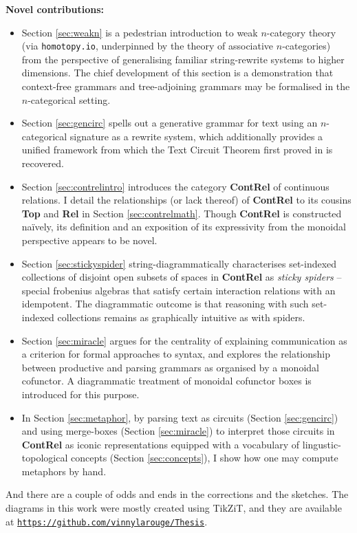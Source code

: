 \clearpage
\begin{myboxB}
\textbf{Novel contributions:}
\begin{itemize}

\item Section \ref{sec:weakn} is a pedestrian introduction to weak $n$-category theory (via \texttt{homotopy.io}, underpinned by the theory of associative $n$-categories) from the perspective of generalising familiar string-rewrite systems to higher dimensions. The chief development of this section is a demonstration that context-free grammars and tree-adjoining grammars may be formalised in the $n$-categorical setting.

\item Section \ref{sec:gencirc} spells out a generative grammar for text using an $n$-categorical signature as a rewrite system, which additionally provides a unified framework from which the Text Circuit Theorem first proved in \citep{wang-mascianicaDistillingTextCircuits2023a} is recovered.

\item Section \ref{sec:contrelintro} introduces the category \textbf{ContRel} of continuous relations. I detail the relationships (or lack thereof) of \textbf{ContRel} to its cousins \textbf{Top} and \textbf{Rel} in Section \ref{sec:contrelmath}. Though \textbf{ContRel} is constructed na\"{i}vely, its definition and an exposition of its expressivity from the monoidal perspective appears to be novel.

\item Section \ref{sec:stickyspider} string-diagrammatically characterises set-indexed collections of disjoint open subsets of spaces in \textbf{ContRel} as \emph{sticky spiders} -- special frobenius algebras that satisfy certain interaction relations with an idempotent. The diagrammatic outcome is that reasoning with such set-indexed collections remains as graphically intuitive as with spiders.

\item Section \ref{sec:miracle} argues for the centrality of explaining communication as a criterion for formal approaches to syntax, and explores the relationship between productive and parsing grammars as organised by a monoidal cofunctor. A diagrammatic treatment of monoidal cofunctor boxes is introduced for this purpose.

\item In Section \ref{sec:metaphor}, by parsing text as circuits (Section \ref{sec:gencirc}) and using merge-boxes (Section \ref{sec:miracle}) to interpret those circuits in \textbf{ContRel} as iconic representations equipped with a vocabulary of lingustic-topological concepts (Section \ref{sec:concepts}), I show how one may compute metaphors by hand.
\end{itemize}

And there are a couple of odds and ends in the corrections and the sketches. The diagrams in this work were mostly created using TikZiT, and they are available at \href{https://github.com/vinnylarouge/Thesis}{\texttt{https://github.com/vinnylarouge/Thesis}}.
\end{myboxB}
\vfill
\clearpage
\newpage

